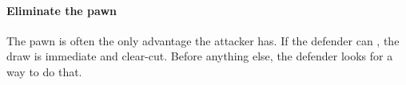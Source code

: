 \paragraph{Eliminate the pawn}\label{eliminate-the-pawn}

The pawn is often the only advantage the attacker has. If the defender can
, the draw is immediate and clear-cut. Before anything else, the
defender looks for a way to do that.
